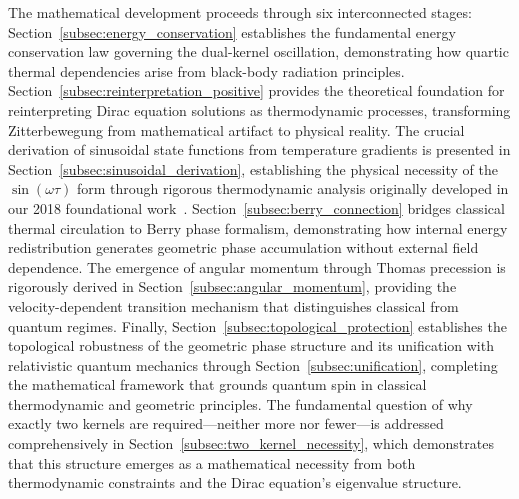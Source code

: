 \documentclass[%
 reprint,
 amsmath,amssymb,
 aps,
]{revtex4-1}
\numberwithin{equation}{section}%
\begin{document}
The mathematical development proceeds through six interconnected stages: Section~\ref{subsec:energy_conservation} establishes the fundamental energy conservation law governing the dual-kernel oscillation, demonstrating how quartic thermal dependencies arise from black-body radiation principles. Section~\ref{subsec:reinterpretation_positive} provides the theoretical foundation for reinterpreting Dirac equation solutions as thermodynamic processes, transforming Zitterbewegung from mathematical artifact to physical reality. The crucial derivation of sinusoidal state functions from temperature gradients is presented in Section~\ref{subsec:sinusoidal_derivation}, establishing the physical necessity of the $\sin(\omega\tau)$ form through rigorous thermodynamic analysis originally developed in our 2018 foundational work~\cite{hanamura1811.0312}. Section~\ref{subsec:berry_connection} bridges classical thermal circulation to Berry phase formalism, demonstrating how internal energy redistribution generates geometric phase accumulation without external field dependence. The emergence of angular momentum through Thomas precession is rigorously derived in Section~\ref{subsec:angular_momentum}, providing the velocity-dependent transition mechanism that distinguishes classical from quantum regimes. Finally, Section~\ref{subsec:topological_protection} establishes the topological robustness of the geometric phase structure and its unification with relativistic quantum mechanics through Section~\ref{subsec:unification}, completing the mathematical framework that grounds quantum spin in classical thermodynamic and geometric principles. The fundamental question of why exactly two kernels are required—neither more nor fewer—is addressed comprehensively in Section~\ref{subsec:two_kernel_necessity}, which demonstrates that this structure emerges as a mathematical necessity from both thermodynamic constraints and the Dirac equation's eigenvalue structure.
\end{document}
